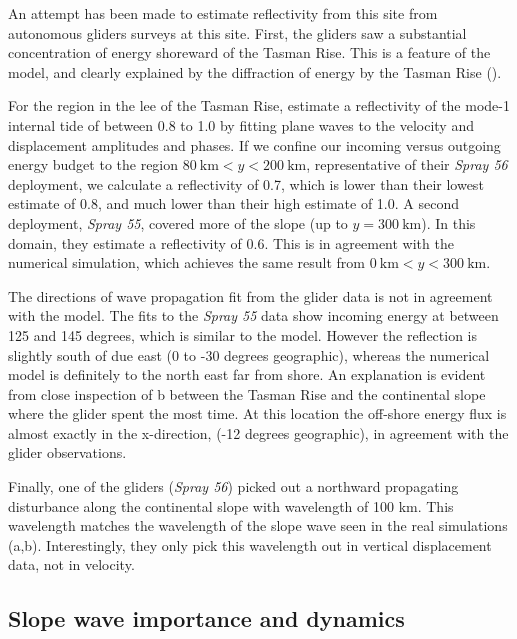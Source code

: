 \documentclass[10pt]{article}
\begin{document}
An attempt has been made to estimate reflectivity from this site from autonomous gliders surveys at this site\citep{johnstonetal15}.  First, the gliders saw a substantial concentration of energy shoreward of the Tasman Rise.  This is a feature of the model, and clearly explained by the diffraction of energy by the Tasman Rise ().   

For the region in the lee of the Tasman Rise, \citet{johnstonetal15} estimate a reflectivity of the mode-1 internal tide of between 0.8 to 1.0 by fitting plane waves to the velocity and displacement amplitudes and phases.  If we confine our incoming versus outgoing energy budget to the region $80\ \mathrm{km}< y < 200\ \mathrm{km}$, representative of their \emph{Spray 56} deployment, we calculate a reflectivity of 0.7, which is lower than their lowest estimate of 0.8, and much lower than their high estimate of 1.0.  A second deployment, \emph{Spray 55}, covered more of the slope (up to $y=300\ \mathrm{km}$).  In this domain, they estimate a reflectivity of 0.6.  This is in agreement with the numerical simulation, which achieves  the same result from $0\ \mathrm{km}< y < 300\ \mathrm{km}$.  

The directions of wave propagation fit from the glider data is not in agreement with the model.  The fits to the \emph{Spray 55} data show incoming energy at between 125 and 145 degrees, which is similar to the model.  However the reflection is slightly south of due east (0 to -30 degrees geographic), whereas the numerical model is definitely to the north east far from shore.  An explanation is evident from close inspection of b between the Tasman Rise and the continental slope where the glider spent the most time.  At this location the off-shore energy flux is almost exactly in the x-direction, (-12 degrees geographic), in agreement with the glider observations.  

Finally, one of the gliders (\emph{Spray 56}) picked out a northward propagating disturbance along the continental slope with wavelength of 100 km.  This wavelength matches the wavelength of the slope wave seen in the real simulations (a,b).  Interestingly, they only pick this wavelength out in vertical displacement data, not in velocity.  


\subsection{Slope wave importance and dynamics}
\end{document}
